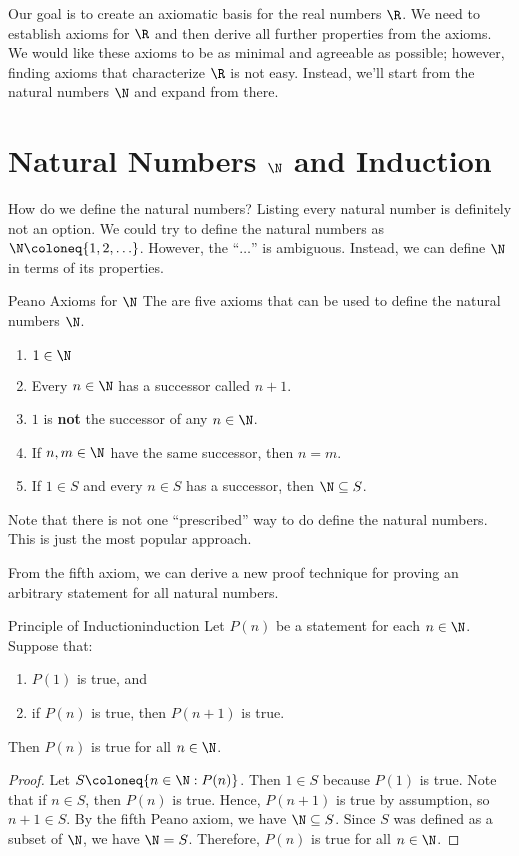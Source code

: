 Our goal is to create an axiomatic basis for the real numbers $\R$. We need to establish axioms for $\R$ and then derive all further properties from the axioms. We would like these axioms to be as minimal and agreeable as possible; however, finding axioms that characterize $\R$ is not easy. Instead, we'll start from the natural numbers $\N$ and expand from there.

\section{Natural Numbers $\N$ and Induction}
How do we define the natural numbers? Listing every natural number is definitely not an option. We could try to define the natural numbers as $\N \coloneq \{ 1, 2, \ldots \}$. However, the ``$\ldots$'' is ambiguous. Instead, we can define $\N$ in terms of its properties.

\begin{dfnbox}{Peano Axioms for $\N$}{}
    The  are five axioms that can be used to define the natural numbers $\N$.
    \begin{enumerate}[noitemsep]
        \item $1 \in \N$
        \item Every $n \in \N$ has a successor called $n+1$.
        \item $1$ is \textbf{not} the successor of any $n \in \N$.
        \item If $n,m \in \N$ have the same successor, then $n = m$.
        \item If $1 \in S$ and every $n \in S$ has a successor, then $\N \subseteq S$.
    \end{enumerate}
\end{dfnbox}

\begin{notebox}
    Note that there is not one ``prescribed'' way to do define the natural numbers. This is just the most popular approach.
\end{notebox}

From the fifth axiom, we can derive a new proof technique for proving an arbitrary statement for all natural numbers.

\begin{thmbox}{Principle of Induction}{induction}
    Let $P(n)$ be a statement for each $n \in \N$. Suppose that:
    \begin{enumerate}[noitemsep]
        \item $P(1)$ is true, and
        \item if $P(n)$ is true, then $P(n+1)$ is true.
    \end{enumerate}
    Then $P(n)$ is true for all $n \in \N$.
    \tcblower
    \begin{proof}
        Let $S \coloneq \{ n \in \N : P(n) \}$. Then $1 \in S$ because $P(1)$ is true. Note that if $n \in S$, then $P(n)$ is true. Hence, $P(n+1)$ is true by assumption, so $n+1 \in S$. By the fifth Peano axiom, we have $\N \subseteq S$. Since $S$ was defined as a subset of $\N$, we have $\N = S$. Therefore, $P(n)$ is true for all $n \in \N$.
    \end{proof}
\end{thmbox}

